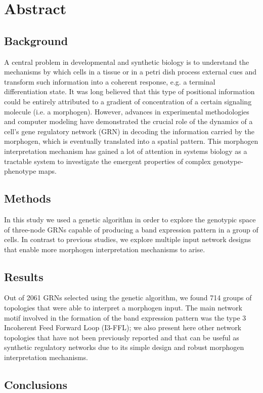 \documentclass[10pt,letterpaper]{article}
\begin{document}
\section*{Abstract}

\subsection*{Background}
A central problem in developmental and synthetic biology is to understand the 
mechanisms by which cells in a tissue or in a petri dish process external cues 
and transform such information into a coherent response, e.g. a terminal 
differentiation state. It was long believed that this type of positional 
information could be entirely attributed to a gradient of concentration of a 
certain signaling molecule (i.e. a morphogen). However, advances in experimental 
methodologies and computer modeling have demonstrated the crucial role of the 
dynamics of a cell's gene regulatory network (GRN) in decoding the information 
carried by the morphogen, which is eventually translated into a spatial 
pattern. This morphogen interpretation mechanism has gained a lot of attention 
in systems biology as a tractable system to investigate the emergent properties 
of complex genotype-phenotype maps.

\subsection*{Methods}
In this study we used a genetic algorithm in order to explore the genotypic 
space of three-node GRNs capable of producing a band expression pattern in a 
group of cells. In contrast to previous studies, we explore multiple input 
network designs that enable more morphogen interpretation mechanisms to arise.

\subsection*{Results}
Out of 2061 GRNs selected using the genetic algorithm, we found 714 groups of 
topologies that were able to interpret a morphogen input. The main network motif 
involved in the formation of the band expression pattern was the type 3 
Incoherent Feed Forward Loop (I3-FFL); we also present here other network 
topologies that have not been previously reported and that can be useful as 
synthetic regulatory networks due to its simple design and robust morphogen 
interpretation mechanisms.

\subsection*{Conclusions}
\end{document}
